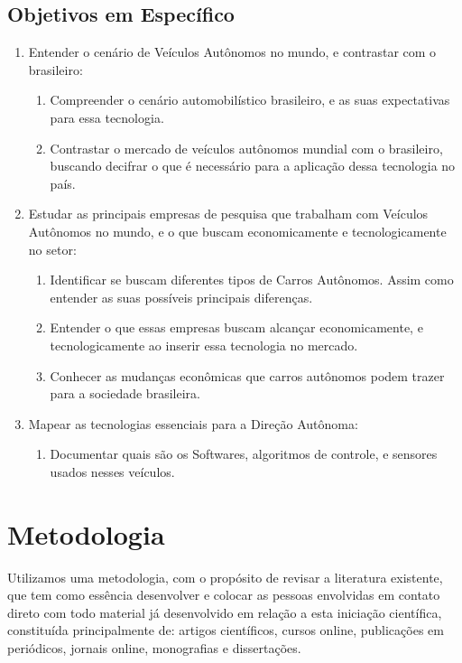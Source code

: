 \section{Objetivos em Específico}\label{Objetivos Específicos}
\begin{enumerate}
    \item  Entender o cenário de Veículos Autônomos no mundo, e contrastar com o brasileiro:
    \begin{enumerate}
        \item Compreender o cenário automobilístico brasileiro, e as suas expectativas para essa tecnologia.
        \item Contrastar o mercado de veículos autônomos mundial com o brasileiro, buscando  decifrar o que é necessário para a aplicação dessa tecnologia no país.
    \end{enumerate}
    \item  Estudar as principais empresas de pesquisa que trabalham com Veículos Autônomos no mundo, e o que buscam economicamente e tecnologicamente no setor:
    \begin{enumerate}
        \item Identificar se buscam diferentes tipos de Carros Autônomos. Assim como entender as suas possíveis principais diferenças.
        \item Entender o que essas empresas buscam alcançar economicamente, e tecnologicamente ao inserir essa tecnologia no mercado.
        \item Conhecer as mudanças econômicas que carros autônomos podem trazer para a sociedade brasileira. 
    \end{enumerate}
    \item Mapear as tecnologias essenciais para a Direção Autônoma:
    \begin{enumerate}
        \item Documentar quais são os Softwares, algoritmos de controle, e sensores usados nesses veículos.  
    \end{enumerate}
\end{enumerate}

\newpage
\chapter{Metodologia} \label{Metodologia}
Utilizamos uma metodologia, com o propósito de revisar a literatura existente, que tem como essência desenvolver e colocar as pessoas envolvidas em contato direto com todo material já desenvolvido em relação a esta iniciação científica, constituída principalmente de: artigos científicos, cursos online, publicações em periódicos, jornais online, monografias e dissertações.

